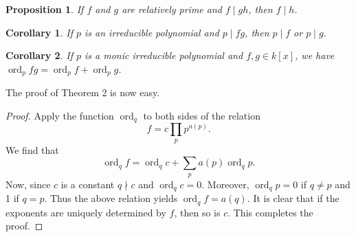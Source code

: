 \documentclass{article}
\newtheorem{corollary}{Corollary}
\newtheorem{proposition}{Proposition}
\numberwithin{proposition}{subsection}
\DeclareMathOperator{\ord}{ord}
\begin{document}
\begin{proposition}
  If $f$ and $g$ are relatively prime and $f \mid gh$, then $f \mid h$.
\end{proposition}

\setcounter{corollary}{0}
\begin{corollary}
  If $p$ is an irreducible polynomial and $p \mid fg$, then $p \mid f$ or $p
  \mid g$.
\end{corollary}

\begin{corollary}
  If $p$ is a monic irreducible polynomial and $f, g \in k[x]$, we have
  $\ord_p fg = \ord_p f + \ord_p g$.
\end{corollary}

The proof of Theorem 2 is now easy.

\begin{proof}
  Apply the function $\ord_q$ to both sides of the relation \[ f =
  c\prod_p p^{a(p)}. \] We find that \[ \ord_q f = \ord_q c +
  \sum_p a(p)\ord_q p. \] Now, since $c$ is a constant $q \nmid c$ and
  $\ord_q c = 0$. Moreover, $\ord_q p = 0$ if $q \neq p$ and 1 if $q = p$. Thus
  the above relation yields $\ord_q f = a(q)$. It is clear that if the
  exponents are uniquely determined by $f$, then so is $c$. This completes the
  proof.
\end{proof}
\end{document}
